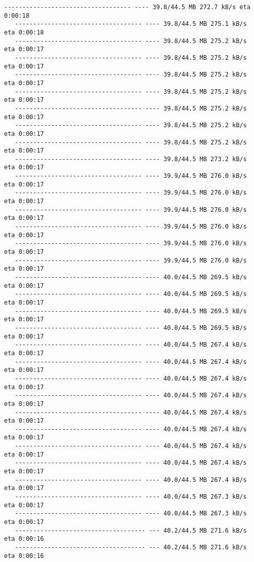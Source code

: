 \documentclass[11pt]{article}
\begin{document}
\begin{Verbatim}[commandchars=\\\{\}]
   ----------------------------------- ---- 39.8/44.5 MB 272.7 kB/s eta 0:00:18
   ----------------------------------- ---- 39.8/44.5 MB 275.1 kB/s eta 0:00:18
   ----------------------------------- ---- 39.8/44.5 MB 275.2 kB/s eta 0:00:17
   ----------------------------------- ---- 39.8/44.5 MB 275.2 kB/s eta 0:00:17
   ----------------------------------- ---- 39.8/44.5 MB 275.2 kB/s eta 0:00:17
   ----------------------------------- ---- 39.8/44.5 MB 275.2 kB/s eta 0:00:17
   ----------------------------------- ---- 39.8/44.5 MB 275.2 kB/s eta 0:00:17
   ----------------------------------- ---- 39.8/44.5 MB 275.2 kB/s eta 0:00:17
   ----------------------------------- ---- 39.8/44.5 MB 275.2 kB/s eta 0:00:17
   ----------------------------------- ---- 39.8/44.5 MB 273.2 kB/s eta 0:00:17
   ----------------------------------- ---- 39.9/44.5 MB 276.0 kB/s eta 0:00:17
   ----------------------------------- ---- 39.9/44.5 MB 276.0 kB/s eta 0:00:17
   ----------------------------------- ---- 39.9/44.5 MB 276.0 kB/s eta 0:00:17
   ----------------------------------- ---- 39.9/44.5 MB 276.0 kB/s eta 0:00:17
   ----------------------------------- ---- 39.9/44.5 MB 276.0 kB/s eta 0:00:17
   ----------------------------------- ---- 39.9/44.5 MB 276.0 kB/s eta 0:00:17
   ----------------------------------- ---- 40.0/44.5 MB 269.5 kB/s eta 0:00:17
   ----------------------------------- ---- 40.0/44.5 MB 269.5 kB/s eta 0:00:17
   ----------------------------------- ---- 40.0/44.5 MB 269.5 kB/s eta 0:00:17
   ----------------------------------- ---- 40.0/44.5 MB 269.5 kB/s eta 0:00:17
   ----------------------------------- ---- 40.0/44.5 MB 267.4 kB/s eta 0:00:17
   ----------------------------------- ---- 40.0/44.5 MB 267.4 kB/s eta 0:00:17
   ----------------------------------- ---- 40.0/44.5 MB 267.4 kB/s eta 0:00:17
   ----------------------------------- ---- 40.0/44.5 MB 267.4 kB/s eta 0:00:17
   ----------------------------------- ---- 40.0/44.5 MB 267.4 kB/s eta 0:00:17
   ----------------------------------- ---- 40.0/44.5 MB 267.4 kB/s eta 0:00:17
   ----------------------------------- ---- 40.0/44.5 MB 267.4 kB/s eta 0:00:17
   ----------------------------------- ---- 40.0/44.5 MB 267.4 kB/s eta 0:00:17
   ----------------------------------- ---- 40.0/44.5 MB 267.4 kB/s eta 0:00:17
   ----------------------------------- ---- 40.0/44.5 MB 267.3 kB/s eta 0:00:17
   ----------------------------------- ---- 40.0/44.5 MB 267.3 kB/s eta 0:00:17
   ------------------------------------ --- 40.2/44.5 MB 271.6 kB/s eta 0:00:16
   ------------------------------------ --- 40.2/44.5 MB 271.6 kB/s eta 0:00:16

\end{Verbatim}
\end{document}
